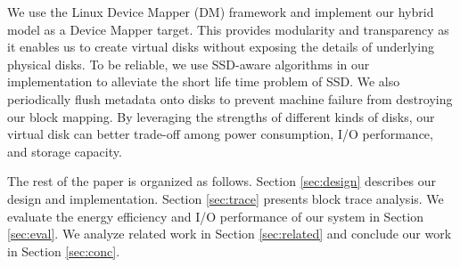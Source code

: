 We use the Linux Device Mapper (DM) framework and implement our hybrid
model as a Device Mapper target. This provides modularity and
transparency as it enables us to create virtual disks without exposing
the details of underlying physical disks. To be reliable, we use
SSD-aware algorithms in our implementation to alleviate the short life
time problem of SSD. We also periodically flush metadata onto disks to
prevent machine failure from destroying our block mapping. By
leveraging the strengths of different kinds of disks, our virtual disk
can better trade-off among power consumption, I/O performance, and
storage capacity.

The rest of the paper is organized as follows. Section
\ref{sec:design} describes our design and implementation. Section
\ref{sec:trace} presents block trace analysis. We evaluate the energy
efficiency and I/O performance of our system in Section
\ref{sec:eval}. We analyze related work in Section \ref{sec:related}
and conclude our work in Section \ref{sec:conc}.

